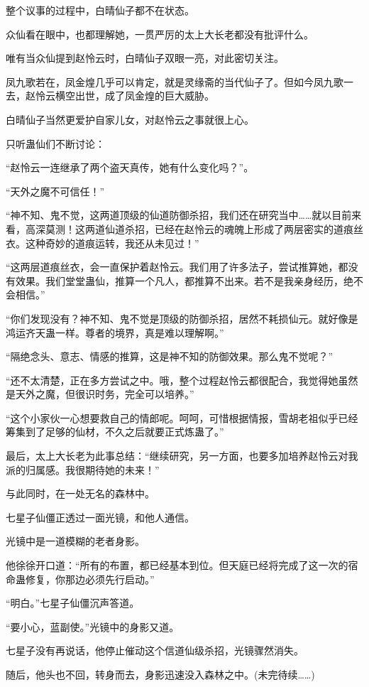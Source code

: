 \begin{this_body}
整个议事的过程中，白晴仙子都不在状态。

众仙看在眼中，也都理解她，一贯严厉的太上大长老都没有批评什么。

唯有当众仙提到赵怜云时，白晴仙子双眼一亮，对此密切关注。

凤九歌若在，凤金煌几乎可以肯定，就是灵缘斋的当代仙子了。但如今凤九歌一去，赵怜云横空出世，成了凤金煌的巨大威胁。

白晴仙子当然更爱护自家儿女，对赵怜云之事就很上心。

只听蛊仙们不断讨论：

“赵怜云一连继承了两个盗天真传，她有什么变化吗？”。

“天外之魔不可信任！”

“神不知、鬼不觉，这两道顶级的仙道防御杀招，我们还在研究当中……就以目前来看，高深莫测！这两道仙道杀招，已经在赵怜云的魂魄上形成了两层密实的道痕丝衣。这种奇妙的道痕运转，我还从未见过！”

“这两层道痕丝衣，会一直保护着赵怜云。我们用了许多法子，尝试推算她，都没有效果。我们堂堂蛊仙，推算一个凡人，都推算不出来。若不是我亲身经历，绝不会相信。”

“你们发现没有？神不知、鬼不觉是顶级的防御杀招，居然不耗损仙元。就好像是鸿运齐天蛊一样。尊者的境界，真是难以理解啊。”

“隔绝念头、意志、情感的推算，这是神不知的防御效果。那么鬼不觉呢？”

“还不太清楚，正在多方尝试之中。哦，整个过程赵怜云都很配合，我觉得她虽然是天外之魔，但很识时务，完全可以培养。”

“这个小家伙一心想要救自己的情郎呢。呵呵，可惜根据情报，雪胡老祖似乎已经筹集到了足够的仙材，不久之后就要正式炼蛊了。”

最后，太上大长老为此事总结：“继续研究，另一方面，也要多加培养赵怜云对我派的归属感。我很期待她的未来！”

与此同时，在一处无名的森林中。

七星子仙僵正透过一面光镜，和他人通信。

光镜中是一道模糊的老者身影。

他徐徐开口道：“所有的布置，都已经基本到位。但天庭已经将完成了这一次的宿命蛊修复，你那边必须先行启动。”

“明白。”七星子仙僵沉声答道。

“要小心，蓝副使。”光镜中的身影又道。

七星子没有再说话，他停止催动这个信道仙级杀招，光镜骤然消失。

随后，他头也不回，转身而去，身影迅速没入森林之中。(未完待续……)

\end{this_body}

